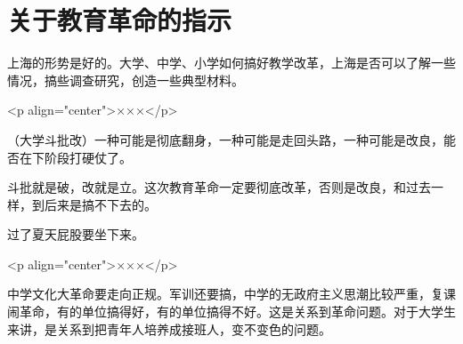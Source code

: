 \section[关于教育革命的指示（一九六七年七月）]{关于教育革命的指示}


上海的形势是好的。大学、中学、小学如何搞好教学改革，上海是否可以了解一些情况，搞些调查研究，创造一些典型材料。

<p align="center">×××</p>

（大学斗批改）一种可能是彻底翻身，一种可能是走回头路，一种可能是改良，能否在下阶段打硬仗了。

斗批就是破，改就是立。这次教育革命一定要彻底改革，否则是改良，和过去一样，到后来是搞不下去的。

过了夏天屁股要坐下来。

<p align="center">×××</p>

中学文化大革命要走向正规。军训还要搞，中学的无政府主义思潮比较严重，复课闹革命，有的单位搞得好，有的单位搞得不好。这是关系到革命问题。对于大学生来讲，是关系到把青年人培养成接班人，变不变色的问题。

